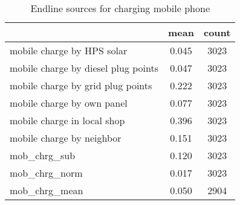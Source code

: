 \begin{table}[htbp]\centering
\def\sym#1{\ifmmode^{#1}\else\(^{#1}\)\fi}
\caption{Endline sources for charging mobile phone \label{tab:"label"}}
\begin{tabular*}{0.9\hsize}{@{\hskip\tabcolsep\extracolsep\fill}l*{1}{cc}}
\toprule
                                &     mean&    count\\
\midrule
mobile charge by HPS solar      &    0.045&     3023\\
mobile charge by diesel plug points&    0.047&     3023\\
mobile charge by grid plug points&    0.222&     3023\\
mobile charge by own panel      &    0.077&     3023\\
mobile charge in local shop     &    0.396&     3023\\
mobile charge by neighbor       &    0.151&     3023\\
mob\_chrg\_sub                    &    0.120&     3023\\
mob\_chrg\_norm                   &    0.017&     3023\\
mob\_chrg\_mean                   &    0.050&     2904\\
\bottomrule
\end{tabular*}
\end{table}
